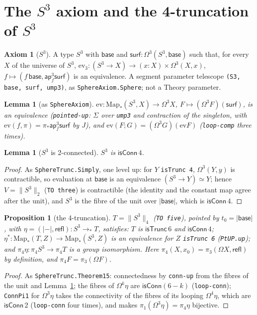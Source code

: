 \documentclass[11pt]{amsart}
\newtheorem{proposition}[theorem]{Proposition}
\newtheorem{lemma}[theorem]{Lemma}
\theoremstyle{definition}
\newtheorem{axiom}[theorem]{Axiom}
\theoremstyle{remark}
\newcommand{\Om}{\Omega}
\newcommand{\Map}{\mathrm{Map}_*}
\newcommand{\code}[1]{\texttt{#1}}
\newcommand{\cT}{\mathsf{isTrunc}}
\newcommand{\cC}{\mathsf{isConn}}
\newcommand{\refl}{\mathsf{refl}}
\newcommand{\ap}{\mathsf{ap}}
\newcommand{\lp}{\Omega}
\newcommand{\tr}[1]{\|#1\|}
\begin{document}
\section{The $S^3$ axiom and the 4-truncation of $S^3$}

\begin{axiom}[$S^3$]\label{a:s3}
A type $S^3$ with $\mathsf{base}$ and $\mathsf{surf}:\Om^3(S^3,\mathsf{base})$
such that, for every $X$ of the universe of $S^3$, $\mathrm{ev}_3:(S^3\to
X)\to(x:X)\times\Om^3(X,x)$, $f\mapsto(f\,\mathsf{base},\ap^3_f\mathsf{surf})$
is an equivalence. A segment parameter telescope
\code{(S3, base, surf, ump3)}, as \code{SphereAxiom.Sphere}; not a Theory
parameter.
\end{axiom}

\begin{lemma}[as \code{SphereAxiom}]\label{l:ev3}
$\mathrm{ev}:\Map(S^3,X)\to\Om^3X$, $F\mapsto(\lp^3F)(\mathsf{surf})$, is an
equivalence (\code{pointed-up}: $\Sigma$ over \code{ump3} and contraction of the
singleton, with $\mathrm{ev}(f,\pi)=\pi_*\ap^3_f\mathsf{surf}$ by $J$), and
$\mathrm{ev}(F;G)=(\lp^3G)(\mathrm{ev}F)$ (\code{loop-comp} three times).
\end{lemma}

\begin{lemma}[$S^3$ is 2-connected]\label{l:s3conn}
$S^3$ is $\cC\,4$.
\end{lemma}
\begin{proof}
As \code{SphereTrunc.Simply}, one level up: for $Y$ \code{isTrunc 4},
$\Om^3(Y,y)$ is contractible, so evaluation at $\mathsf{base}$ is an
equivalence $(S^3\to Y)\simeq Y$; hence $V=\tr{S^3}_2$ (\code{TO three}) is
contractible (the identity and the constant map agree after the unit), and
$S^3$ is the fibre of the unit over $|\mathsf{base}|$, which is $\cC\,4$.
\end{proof}

\begin{proposition}[the 4-truncation]\label{p:trunc4}
$T=\tr{S^3}_4$ (\code{TO five}), pointed by $t_0=|\mathsf{base}|$, with
$\eta=(|{-}|,\refl):S^3\to_*T$, satisfies: $T$ is $\cT\,6$ and $\cC\,4$;
$\eta^*:\Map(T,Z)\to\Map(S^3,Z)$ is an equivalence for $Z$ \code{isTrunc 6}
(\code{PtUP.up}); and $\pi_4\eta:\pi_4S^3\to\pi_4T$ is a group isomorphism.
Here $\pi_4(X,x_0)=\pi_3(\Om X,\refl)$ by definition, and $\pi_4F=\pi_3(\lp F)$.
\end{proposition}
\begin{proof}
As \code{SphereTrunc.Theorem15}: connectedness by \code{conn-up} from the
fibres of the unit and Lemma~\ref{l:s3conn}; the fibres of $\lp^k\eta$ are
$\cC(6-k)$ (\code{loop-conn}); \code{ConnPi1} for $\lp^3\eta$ takes the
connectivity of the fibres of its looping $\lp^4\eta$, which are $\cC\,2$
(\code{loop-conn} four times), and makes $\pi_1(\lp^3\eta)=\pi_4\eta$ bijective.
\end{proof}
\end{document}
